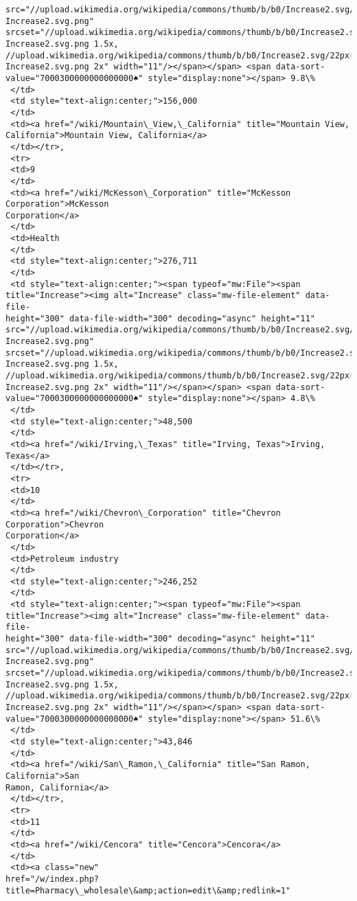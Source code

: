 \documentclass[11pt]{article}
\begin{document}
\begin{tcolorbox}[breakable, size=fbox, boxrule=.5pt, pad at break*=1mm, opacityfill=0]
\begin{Verbatim}[commandchars=\\\{\}]
src="//upload.wikimedia.org/wikipedia/commons/thumb/b/b0/Increase2.svg/11px-
Increase2.svg.png"
srcset="//upload.wikimedia.org/wikipedia/commons/thumb/b/b0/Increase2.svg/17px-
Increase2.svg.png 1.5x,
//upload.wikimedia.org/wikipedia/commons/thumb/b/b0/Increase2.svg/22px-
Increase2.svg.png 2x" width="11"/></span></span> <span data-sort-
value="7000300000000000000♠" style="display:none"></span> 9.8\%
 </td>
 <td style="text-align:center;">156,000
 </td>
 <td><a href="/wiki/Mountain\_View,\_California" title="Mountain View,
California">Mountain View, California</a>
 </td></tr>,
 <tr>
 <td>9
 </td>
 <td><a href="/wiki/McKesson\_Corporation" title="McKesson Corporation">McKesson
Corporation</a>
 </td>
 <td>Health
 </td>
 <td style="text-align:center;">276,711
 </td>
 <td style="text-align:center;"><span typeof="mw:File"><span
title="Increase"><img alt="Increase" class="mw-file-element" data-file-
height="300" data-file-width="300" decoding="async" height="11"
src="//upload.wikimedia.org/wikipedia/commons/thumb/b/b0/Increase2.svg/11px-
Increase2.svg.png"
srcset="//upload.wikimedia.org/wikipedia/commons/thumb/b/b0/Increase2.svg/17px-
Increase2.svg.png 1.5x,
//upload.wikimedia.org/wikipedia/commons/thumb/b/b0/Increase2.svg/22px-
Increase2.svg.png 2x" width="11"/></span></span> <span data-sort-
value="7000300000000000000♠" style="display:none"></span> 4.8\%
 </td>
 <td style="text-align:center;">48,500
 </td>
 <td><a href="/wiki/Irving,\_Texas" title="Irving, Texas">Irving, Texas</a>
 </td></tr>,
 <tr>
 <td>10
 </td>
 <td><a href="/wiki/Chevron\_Corporation" title="Chevron Corporation">Chevron
Corporation</a>
 </td>
 <td>Petroleum industry
 </td>
 <td style="text-align:center;">246,252
 </td>
 <td style="text-align:center;"><span typeof="mw:File"><span
title="Increase"><img alt="Increase" class="mw-file-element" data-file-
height="300" data-file-width="300" decoding="async" height="11"
src="//upload.wikimedia.org/wikipedia/commons/thumb/b/b0/Increase2.svg/11px-
Increase2.svg.png"
srcset="//upload.wikimedia.org/wikipedia/commons/thumb/b/b0/Increase2.svg/17px-
Increase2.svg.png 1.5x,
//upload.wikimedia.org/wikipedia/commons/thumb/b/b0/Increase2.svg/22px-
Increase2.svg.png 2x" width="11"/></span></span> <span data-sort-
value="7000300000000000000♠" style="display:none"></span> 51.6\%
 </td>
 <td style="text-align:center;">43,846
 </td>
 <td><a href="/wiki/San\_Ramon,\_California" title="San Ramon, California">San
Ramon, California</a>
 </td></tr>,
 <tr>
 <td>11
 </td>
 <td><a href="/wiki/Cencora" title="Cencora">Cencora</a>
 </td>
 <td><a class="new"
href="/w/index.php?title=Pharmacy\_wholesale\&amp;action=edit\&amp;redlink=1"

\end{Verbatim}
\end{tcolorbox}
\end{document}
